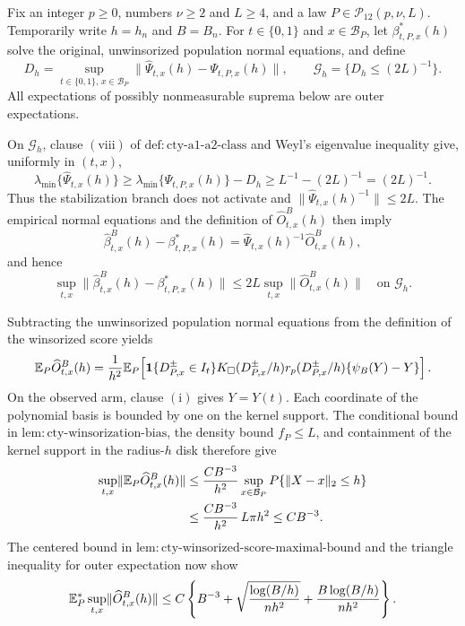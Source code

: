 Fix an integer \(p\geq0\), numbers \(\nu\geq2\) and \(L\geq4\), and a law \(P\in\mathcal P_{12}(p,\nu,L)\).  Temporarily write \(h=h_n\) and \(B=B_n\).  For \(t\in\{0,1\}\) and \(x\in\mathcal B_P\), let \(\beta^*_{t,P,x}(h)\) solve the original, unwinsorized population normal equations, and define
\[
 D_h=\sup_{t\in\{0,1\},\,x\in\mathcal B_P}
 \lVert\widehat\Psi_{t,x}(h)-\Psi_{t,P,x}(h)\rVert,
 \qquad
 \mathcal G_h=\{D_h\leq(2L)^{-1}\}.
\]
All expectations of possibly nonmeasurable suprema below are outer expectations.

On \(\mathcal G_h\), clause \(\mathrm{(viii)}\) of \(\mathrm{def:cty\text{-}a1\text{-}a2\text{-}class}\) and Weyl's eigenvalue inequality give, uniformly in \((t,x)\),
\[
 \lambda_{\min}\{\widehat\Psi_{t,x}(h)\}
 \geq \lambda_{\min}\{\Psi_{t,P,x}(h)\}-D_h
 \geq L^{-1}-(2L)^{-1}=(2L)^{-1}.
\]
Thus the stabilization branch does not activate and
\(\lVert\widehat\Psi_{t,x}(h)^{-1}\rVert\leq2L\).  The empirical normal equations and the definition of \(\widehat O^B_{t,x}(h)\) then imply
\[
 \widehat\beta^B_{t,x}(h)-\beta^*_{t,P,x}(h)
 =\widehat\Psi_{t,x}(h)^{-1}\widehat O^B_{t,x}(h),
\]
and hence
\[
 \sup_{t,x}\lVert\widehat\beta^B_{t,x}(h)-\beta^*_{t,P,x}(h)\rVert
 \leq 2L\sup_{t,x}\lVert\widehat O^B_{t,x}(h)\rVert
 \quad\text{on }\mathcal G_h.
\]

Subtracting the unwinsorized population normal equations from the definition of the winsorized score yields
\[
 \mathbb E_P\widehat O^B_{t,x}(h)
 ={1\over h^2}\mathbb E_P\!\left[
 \mathbf1\{D^{\pm}_{P,x}\in I_t\}K_\square(D^{\pm}_{P,x}/h)
 r_p(D^{\pm}_{P,x}/h)\{\psi_B(Y)-Y\}
 \right].
\]
On the observed arm, clause \(\mathrm{(i)}\) gives \(Y=Y(t)\).  Each coordinate of the polynomial basis is bounded by one on the kernel support.  The conditional bound in \(\mathrm{lem:cty\text{-}winsorization\text{-}bias}\), the density bound \(f_P\leq L\), and containment of the kernel support in the radius-\(h\) disk therefore give
\[
 \begin{split}
 \sup_{t,x}\lVert\mathbb E_P\widehat O^B_{t,x}(h)\rVert
 &\leq {CB^{-3}\over h^2}
 \sup_{x\in\mathcal B_P}P\{\lVert X-x\rVert_2\leq h\}\\
 &\leq {CB^{-3}\over h^2}\,L\pi h^2
 \leq CB^{-3}.
 \end{split}
\]
The centered bound in \(\mathrm{lem:cty\text{-}winsorized\text{-}score\text{-}maximal\text{-}bound}\) and the triangle inequality for outer expectation now show
\[
 \mathbb E_P^*\sup_{t,x}\lVert\widehat O^B_{t,x}(h)\rVert
 \leq C\left\{B^{-3}+\sqrt{{\log(B/h)\over nh^2}}
 +{B\log(B/h)\over nh^2}\right\}.
\]

